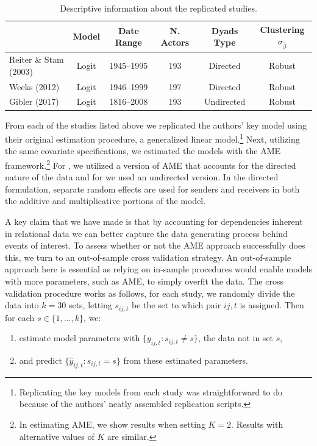 \begin{table}
\caption{Descriptive information about the replicated studies. }
	\begin{tabular}{lccccc}
		& Model &  Date Range & N. Actors  & Dyads Type & Clustering $\sigma_{\hat{\beta}}$ \\ \toprule
		Reiter \& Stam (2003) & Logit &1945--1995 &  193 & Directed & Robust \\	
		Weeks (2012) & Logit & 1946--1999 & 197 & Directed & Robust \\
		Gibler (2017) & Logit & 1816--2008 & 193 & Undirected & Robust \\ \bottomrule
	\end{tabular}
	\label{tab:modelDesign}
\end{table}

From each of the studies listed above we replicated the authors' key model using their original estimation procedure, a generalized linear model.\footnote{Replicating the key models from each study was straightforward to do because of the authors' neatly assembled replication scripts.} Next, utilizing the same covariate specifications, we estimated the models with the AME framework.\footnote{In estimating AME, we show results when setting $K=2$. Results with alternative values of $K$ are similar.} For \citet{reiter:stam:2003, weeks:2012}, we utilized a version of AME that accounts for the directed nature of the data and for \citet{gibler:2017} we used an undirected version. In the directed formulation, separate random effects are used for senders and receivers in both the additive and multiplicative portions of the model. 

A key claim that we have made is that by accounting for dependencies inherent in relational data we can better capture the data generating process behind events of interest. To assess whether or not the AME approach successfully does this, we turn to an out-of-sample cross validation strategy. An out-of-sample approach here is essential as relying on in-sample procedures would enable models with more parameters, such as AME, to simply overfit the data. The cross validation procedure works as follows, for each study, we randomly divide the data into $k=30$ sets, letting $s_{ij,t}$ be the set to which pair $ij,t$ is assigned. Then for each $s \in \{1,\ldots,k\}$, we:

\begin{enumerate}
	\item estimate model parameters with $\{y_{ij,t}: s_{ij,t} \neq s\}$, the data not in set $s$,
	\item and predict $\{\hat{y}_{ij,t}: s_{ij,t} = s\}$ from these estimated parameters. 
\end{enumerate}

